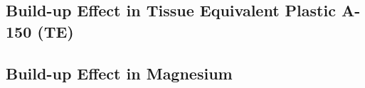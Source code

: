 \subsection{Build-up Effect in Tissue Equivalent Plastic A-150 (TE)}

\subsection{Build-up Effect in Magnesium}

